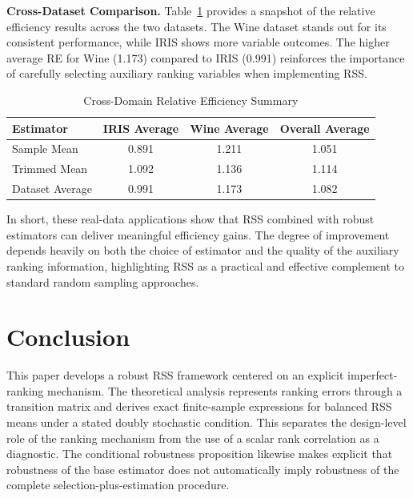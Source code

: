 \documentclass[12pt]{article}
\makeatletter
\let\oldparagraph\paragraph
\renewcommand{\paragraph}{
    \@ifstarcorollary
      \xxxParagraphStar
      \xxxParagraphNoStar
  }
\newcommand{\xxxParagraphStar}[1]{\oldparagraph*{#1}\mbox{}}
\newcommand{\xxxParagraphNoStar}[1]{\oldparagraph{#1}\mbox{}}
\makeatother
\begin{document}
{\bf Cross-Dataset Comparison.}
Table~\ref{tab:cross_domain} provides a snapshot of the relative efficiency results across the two datasets. The Wine dataset stands out for its consistent performance, while IRIS shows more variable outcomes. The higher average RE for Wine (1.173) compared to IRIS (0.991) reinforces the importance of carefully selecting auxiliary ranking variables when implementing RSS.

\begin{table}[htbp]
\centering
\caption{Cross-Domain Relative Efficiency Summary}
\label{tab:cross_domain}
\begin{tabular}{l c c c}
\hline
Estimator & IRIS Average & Wine Average & Overall Average \\
\hline
Sample Mean & 0.891 & 1.211 & 1.051 \\
Trimmed Mean & 1.092 & 1.136 & 1.114 \\
\hline
Dataset Average & 0.991 & 1.173 & 1.082 \\
\hline
\end{tabular}
\end{table}

In short, these real-data applications show that RSS combined with robust estimators can deliver meaningful efficiency gains. The degree of improvement depends heavily on both the choice of estimator and the quality of the auxiliary ranking information, highlighting RSS as a practical and effective complement to standard random sampling approaches.

\section{Conclusion}
\label{sec:conclusion}
This paper develops a robust RSS framework centered on an explicit imperfect-ranking mechanism. The theoretical analysis represents ranking errors through a transition matrix and derives exact finite-sample expressions for balanced RSS means under a stated doubly stochastic condition. This separates the design-level role of the ranking mechanism from the use of a scalar rank correlation as a diagnostic. The conditional robustness proposition likewise makes explicit that robustness of the base estimator does not automatically imply robustness of the complete selection-plus-estimation procedure.
\end{document}
